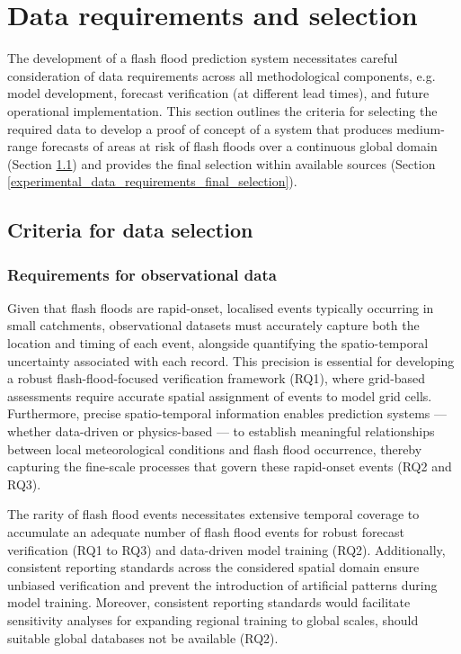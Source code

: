 \section{Data requirements and selection}
\label{experimental_data_requirements}

The development of a flash flood prediction system necessitates careful consideration of data requirements across all methodological components, e.g. model development, forecast verification (at different lead times), and future operational implementation. This section outlines the criteria for selecting the required data to develop a proof of concept of a system that produces medium-range forecasts of areas at risk of flash floods over a continuous global domain (Section \ref{experimental_data_requirements_data_selection_criteria}) and provides the final selection within available sources (Section \ref{experimental_data_requirements_final_selection}). 


\subsection{Criteria for data selection}
\label{experimental_data_requirements_data_selection_criteria}

\subsubsection{Requirements for observational data}

Given  that flash floods are rapid-onset, localised events typically occurring in small catchments, observational datasets must accurately capture both the location and timing of each event, alongside quantifying the spatio-temporal uncertainty associated with each record. This precision is essential for developing a robust flash-flood-focused verification framework (RQ1), where grid-based assessments require accurate spatial assignment of events to model grid cells. Furthermore, precise spatio-temporal information enables prediction systems — whether data-driven or physics-based — to establish meaningful relationships between local meteorological conditions and flash flood occurrence, thereby capturing the fine-scale processes that govern these rapid-onset events (RQ2 and RQ3).

The  rarity of flash flood events necessitates extensive temporal coverage to accumulate an adequate number of flash flood events for robust forecast verification (RQ1 to RQ3) and data-driven model training (RQ2). Additionally, consistent reporting standards across the considered spatial domain ensure unbiased verification and prevent the introduction of artificial patterns during model training. Moreover, consistent reporting standards would facilitate sensitivity analyses for expanding regional training to global scales, should suitable global databases not be available (RQ2).

